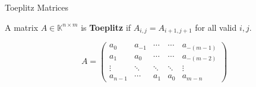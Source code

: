 \begin{frame}{Toeplitz Matrices}
  \begin{definition}
    A matrix $A \in \mathbb{K}^{n \times m}$ is \textbf{Toeplitz} if
    $A_{i,j} = A_{i+1,j+1}$ for all valid $i, j$.
  \end{definition}
  \vspace{0.5em}
  \[
    A =
    \begin{pmatrix}
      a_0    & a_{-1} & \cdots & \cdots     & a_{-(m-1)}    \\
      a_1    & a_0    & \cdots & \cdots     & a_{-(m-2)}    \\
      \vdots & \ddots & \ddots & \ddots     & \vdots        \\
      a_{n-1}& \cdots & a_1    & a_0        & a_{m-n}
    \end{pmatrix}
  \]
\end{frame}